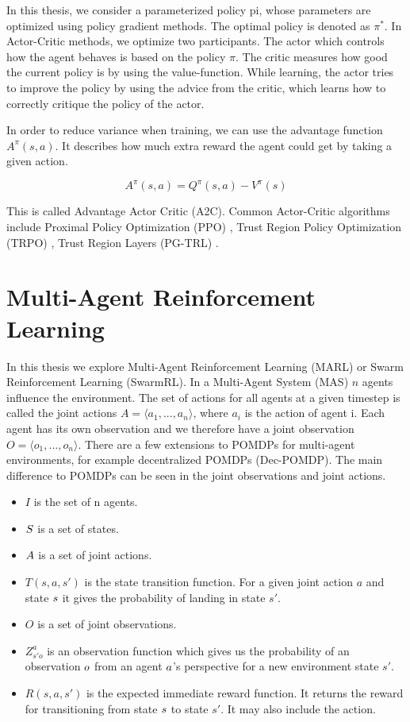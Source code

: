 In this thesis, we consider a parameterized policy pi, whose parameters are optimized using policy gradient methods. The optimal policy is denoted as $\pi^*$. In Actor-Critic methods, we optimize two participants. The actor which controls how the agent behaves is based on the policy $\pi$. The critic measures how good the current policy is by using the value-function. While learning, the actor tries to improve the policy by using the advice from the critic, which learns how to correctly critique the policy of the actor. \par

In order to reduce variance when training, we can use the advantage function $A^\pi(s,a)$. It describes how much extra reward the agent could get by taking a given action.

\begin{equation}
    A^\pi(s,a) = Q^\pi(s,a) - V^\pi(s)\nonumber
\end{equation} 

This is called Advantage Actor Critic (A2C). Common Actor-Critic algorithms include Proximal Policy Optimization (PPO) , Trust Region Policy Optimization (TRPO) , Trust Region Layers (PG-TRL) .


\section{Multi-Agent Reinforcement Learning}
In this thesis we explore Multi-Agent Reinforcement Learning (MARL) or Swarm Reinforcement Learning (SwarmRL). In a Multi-Agent System (MAS) $n$ agents influence the environment. The set of actions for all agents at a given timestep is called the joint actions $A = \langle a_1,...,a_n\rangle$, where $a_i$ is the action of agent i. Each agent has its own observation and we therefore have a joint observation $O = \langle o_1,...,o_n\rangle$. There are a few extensions to POMDPs for multi-agent environments, for example decentralized POMDPs (Dec-POMDP). The main difference to POMDPs can be seen in the joint observations and joint actions.

\begin{itemize}[noitemsep,nolistsep]
	\item $I$ is the set of n agents.
	\item $S$ is a set of states.
	\item $A$ is a set of joint actions.
	\item $T(s, a, s')$ is the state transition function. For a given joint action $a$ and state $s$ it gives the probability of landing in state $s'$.
	\item $O$ is a set of joint observations.
	\item $Z_{s'o}^a$ is an observation function which gives us the probability of an observation $o$ from an agent $a$'s perspective for a new environment state $s'$.
	\item $R(s,a,s')$ is the expected immediate reward function. It returns the reward for transitioning from state $s$ to state $s'$. It may also include the action.
\end{itemize}

